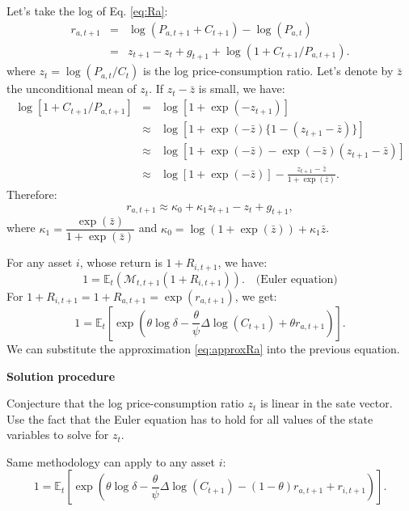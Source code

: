 \documentclass[
  12pt,
]{book}
\theoremstyle{definition}
\theoremstyle{definition}
\theoremstyle{definition}
\theoremstyle{definition}
\theoremstyle{remark}
\begin{document}
Let's take the log of Eq. \eqref{eq:Ra}:
\begin{eqnarray*}
r_{a,t+1} &=& \log(P_{a,t+1}+C_{t+1}) - \log(P_{a,t})\\
&=& z_{t+1} - z_t + g_{t+1} + \log(1 + C_{t+1} / P_{a,t+1}).
\end{eqnarray*}
where \(z_t = \log(P_{a,t}/C_t)\) is the log price-consumption ratio.
Let's denote by \(\bar{z}\) the unconditional mean of \(z_t\). If \(z_t - \bar{z}\) is small, we have:
\begin{eqnarray*}
\log[1 + C_{t+1} / P_{a,t+1}] &=& \log[1 + \exp(-z_{t+1})]\\
&\approx& \log[1 + \exp(-\bar{z})\{1 - (z_{t+1}- \bar{z})\}]\\
&\approx& \log[1 + \exp(-\bar{z}) - \exp(-\bar{z})(z_{t+1}- \bar{z})]\\
&\approx& \log[1 + \exp(-\bar{z})] - \frac{z_{t+1}- \bar{z}}{1 + \exp(\bar{z})}.
\end{eqnarray*}
Therefore:
\begin{equation}
\boxed{r_{a,t+1} \approx \kappa_0 + \kappa_1 z_{t+1} - z_t + g_{t+1},}\label{eq:approxRa}
\end{equation}
where \(\kappa_1= \dfrac{\exp(\bar{z})}{1 + \exp(\bar{z})}\) and \(\kappa_0 = \log(1 + \exp(\bar{z})) + \kappa_1 \bar{z}\).

For any asset \(i\), whose return is \(1+R_{i,t+1}\), we have:
\begin{equation}
1 = \mathbb{E}_t(\mathcal{M}_{t,t+1}(1+R_{i,t+1})). \quad \mbox{(Euler equation)}\label{eq:Euler}
\end{equation}
For \(1+R_{i,t+1} = 1+R_{a,t+1} = \exp(r_{a,t+1})\), we get:
\begin{equation}
1 = \mathbb{E}_t \left[ \exp\left(\theta \log \delta - \frac{\theta}{\psi} \Delta \log(C_{t+1}) + \theta r_{a,t+1} \right) \right].\label{eq:sdfRa}
\end{equation}
We can substitute the approximation \eqref{eq:approxRa} into the previous equation.

\textbf{Solution procedure} \citet{Bansal_Yaron_2004}

Conjecture that the log price-consumption ratio \(z_t\) is linear in the sate vector.
Use the fact that the Euler equation has to hold for all values of the state variables to solve for \(z_t\).

Same methodology can apply to any asset \(i\):
\begin{equation}
1 = \mathbb{E}_t \left[ \exp\left(\theta \log \delta - \frac{\theta}{\psi} \Delta \log(C_{t+1}) - (1 - \theta) r_{a,t+1} + r_{i,t+1} \right) \right].\label{eq:sdfRi}
\end{equation}
\end{document}
